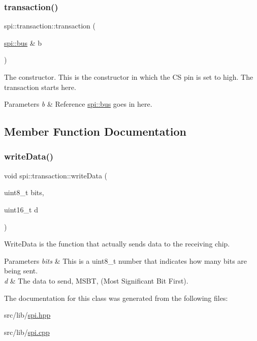 \subsubsection{\texorpdfstring{transaction()}{transaction()}}
{\footnotesize\ttfamily spi\+::transaction\+::transaction (\begin{DoxyParamCaption}\item[{\hyperlink{classspi_1_1bus}{spi\+::bus} \&}]{b }\end{DoxyParamCaption})}



The constructor. This is the constructor in which the CS pin is set to high. The transaction starts here. 


\begin{DoxyParams}{Parameters}
{\em b} & Reference \hyperlink{classspi_1_1bus}{spi\+::bus} goes in here. \\
\hline
\end{DoxyParams}


\subsection{Member Function Documentation}
\mbox{\label{classspi_1_1transaction_af55307deed871fb9b7e9ad13872430e0}} 
\subsubsection{\texorpdfstring{write\+Data()}{writeData()}}
{\footnotesize\ttfamily void spi\+::transaction\+::write\+Data (\begin{DoxyParamCaption}\item[{uint8\+\_\+t}]{bits,  }\item[{uint16\+\_\+t}]{d }\end{DoxyParamCaption})}



Write\+Data is the function that actually sends data to the receiving chip. 


\begin{DoxyParams}{Parameters}
{\em bits} & This is a uint8\+\_\+t number that indicates how many bits are being sent. \\
\hline
{\em d} & The data to send, M\+S\+BT, (Most Significant Bit First). \\
\hline
\end{DoxyParams}


The documentation for this class was generated from the following files\+:\begin{DoxyCompactItemize}
\item 
src/lib/\hyperlink{spi_8hpp}{spi.\+hpp}\item 
src/lib/\hyperlink{spi_8cpp}{spi.\+cpp}\end{DoxyCompactItemize}
